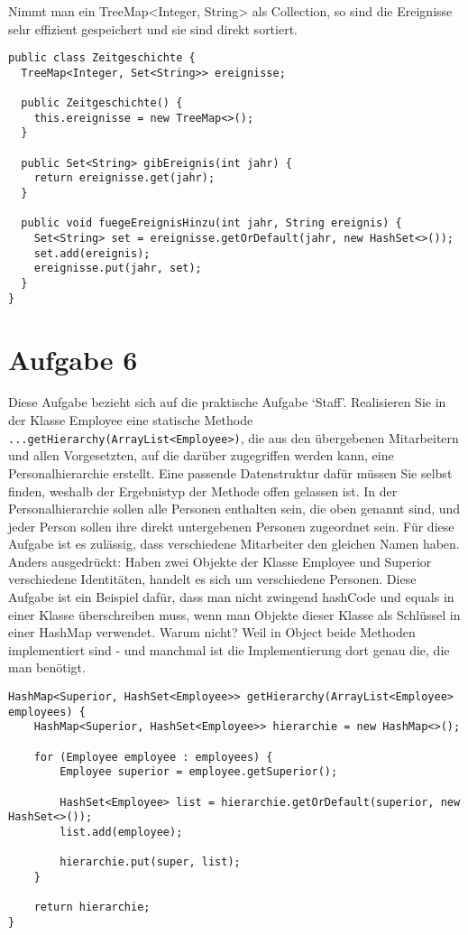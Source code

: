 Nimmt man ein TreeMap<Integer, String> als Collection, so sind die Ereignisse 
sehr effizient gespeichert und sie sind direkt sortiert.

\begin{lstlisting}
public class Zeitgeschichte {
  TreeMap<Integer, Set<String>> ereignisse;

  public Zeitgeschichte() {
    this.ereignisse = new TreeMap<>();
  }

  public Set<String> gibEreignis(int jahr) {
    return ereignisse.get(jahr);
  }

  public void fuegeEreignisHinzu(int jahr, String ereignis) {
    Set<String> set = ereignisse.getOrDefault(jahr, new HashSet<>());
    set.add(ereignis);
    ereignisse.put(jahr, set);
  }
}
\end{lstlisting}

\section{Aufgabe 6}
Diese Aufgabe bezieht sich auf die praktische Aufgabe `Staff'. Realisieren Sie
in der Klasse Employee eine statische Methode \newline
\lstinline{...getHierarchy(ArrayList<Employee>)}, die aus den übergebenen
Mitarbeitern und allen Vorgesetzten, auf die darüber zugegriffen werden kann,
eine Personalhierarchie erstellt. Eine passende Datenstruktur dafür müssen Sie
selbst finden, weshalb der Ergebnistyp der Methode offen gelassen ist. In der
Personalhierarchie sollen alle Personen enthalten sein, die oben genannt sind,
und jeder Person sollen ihre direkt untergebenen Personen zugeordnet sein. Für
diese Aufgabe ist es zulässig, dass verschiedene Mitarbeiter den gleichen Namen
haben. Anders ausgedrückt: Haben zwei Objekte der Klasse Employee und Superior
verschiedene Identitäten, handelt es sich um verschiedene Personen. Diese
Aufgabe ist ein Beispiel dafür, dass man nicht zwingend hashCode und equals in
einer Klasse überschreiben muss, wenn man Objekte dieser Klasse als Schlüssel
in einer HashMap verwendet. Warum nicht? Weil in Object beide Methoden
implementiert sind - und manchmal ist die Implementierung dort genau die, die
man benötigt.

\begin{lstlisting}
HashMap<Superior, HashSet<Employee>> getHierarchy(ArrayList<Employee> employees) {
    HashMap<Superior, HashSet<Employee>> hierarchie = new HashMap<>();

    for (Employee employee : employees) {
        Employee superior = employee.getSuperior();

        HashSet<Employee> list = hierarchie.getOrDefault(superior, new HashSet<>());
        list.add(employee);

        hierarchie.put(super, list);
    }

    return hierarchie;
}

\end{lstlisting}